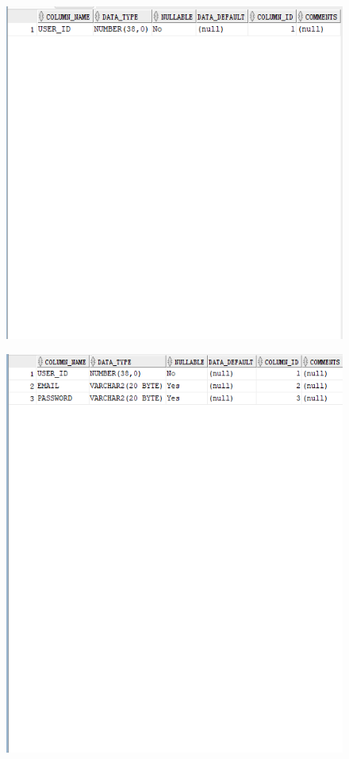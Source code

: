 \documentclass[]{article}
\begin{document}
	\begin{figure}[H]
		\centering
		\includegraphics[width=0.8\linewidth, height=0.3\textheight]{../d3-p/part1-2}
		\caption{}
		\label{fig:part1-2}
	\end{figure}

	\begin{figure}[H]
		\centering
		\includegraphics[width=0.8\linewidth, height=0.3\textheight]{../d3-p/part1-3}
		\caption{}
		\label{fig:part1-3}
	\end{figure}
\end{document}
